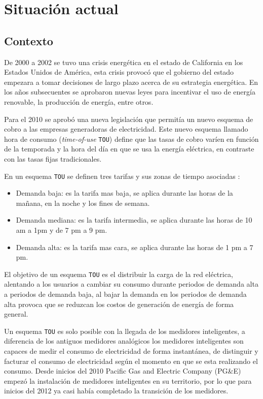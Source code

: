 \chapter{Situación actual}

\section{Contexto}
De 2000 a 2002 se tuvo una crisis energética en el estado de California en los
Estados Unidos de América, esta crisis provocó que el gobierno del estado empezara a
tomar decisiones de largo plazo acerca de su estrategia energética. En los años
subsecuentes se aprobaron nuevas leyes para incentivar el uso de energía renovable,
la producción de energía, entre otros.

Para el 2010 se aprobó una nueva legislación que permitía un nuevo esquema
de cobro a las empresas generadoras de electricidad. Este nuevo esquema
llamado hora de consumo (\textit{time-of-use} \texttt{TOU}) define que las
tasas de cobro varíen en función de la temporada y la hora del día en que
se usa la energía eléctrica, en contraste con las tasas fijas tradicionales.

\vspace{2.5mm}

En un esquema \texttt{TOU} se definen tres tarifas y sus zonas de tiempo asociadas
\cite{16_pge_time_of_use_2015}:

\begin{itemize}
\item  Demanda baja: es la tarifa mas baja, se aplica durante las horas de la
  mañana, en la noche y los fines de semana.
\item Demanda mediana: es la tarifa intermedia, se aplica durante las horas de
  10 am a 1pm y de 7 pm a 9 pm.
\item Demanda alta: es la tarifa mas cara, se aplica durante las horas de
  1 pm a 7 pm.
\end{itemize}

El objetivo de un esquema \texttt{TOU} es el distribuir la carga de la red
eléctrica, alentando a los usuarios a cambiar su consumo durante periodos
de demanda alta a periodos de demanda baja, al bajar la demanda en los periodos
de demanda alta provoca que se reduzcan los costos de generación de energía de
forma general.

Un esquema \texttt{TOU} es solo posible con la llegada de los medidores
inteligentes, a diferencia de los antiguos medidores analógicos los medidores
inteligentes son capaces de medir el consumo de electricidad de forma instantánea,
de distinguir y facturar el consumo de electricidad según el momento en que se
esta realizando el consumo. Desde inicios del 2010 Pacific Gas and
Electric Company (PG\&E) empezó la instalación de medidores inteligentes
en su territorio, por lo que para inicios del 2012 ya casi había
completado la transición de los medidores.


